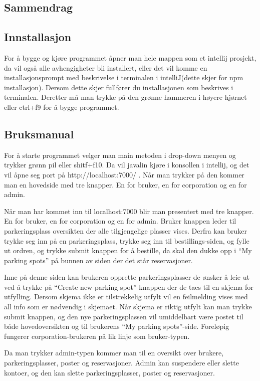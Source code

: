 \documentclass[12pt]{article}
\begin{document}
    \subsection{Sammendrag}

    \subsection{Innstallasjon}
    For å bygge og kjøre programmet åpner man hele mappen som et intellij prosjekt, da vil også alle avhengigheter bli installert, eller det vil komme en installasjonsprompt med beskrivelse i terminalen i  intelliJ(dette skjer for npm installasjon). Dersom dette skjer fullfører du installasjonen som beskrives i terminalen. Deretter må man trykke på den grønne hammeren i høyere hjørnet eller ctrl+f9 for å bygge programmet.

    \subsection{Bruksmanual}
    For å starte programmet velger man main metoden i drop-down menyen og trykker grønn pil eller shitf+f10. Da vil javalin kjøre i konsollen i intellij, og det vil åpne seg port på http://localhost:7000/ . Når man trykker på den kommer man en hovedside med tre knapper. En for bruker, en for corporation og en for admin.
    
    Når man har kommet inn til localhost:7000 blir man presentert med tre knapper. En for bruker, en for corporation og en for admin. Bruker knappen leder til parkeringsplass oversikten der alle tilgjengelige plasser vises. Derfra kan bruker trykke seg inn på en parkeringsplass, trykke seg inn til bestillings-siden, og fylle ut ordren, og trykke submit knappen for å bestille, da skal den dukke opp i “My parking spots” på bunnen av siden der det står reservasjoner.
    
    Inne på denne siden kan brukeren opprette parkeringsplasser de ønsker å leie ut ved å trykke på “Create new parking spot”-knappen der de taes til en skjema for utfylling. Dersom skjema ikke er tilstrekkelig utfylt vil en feilmelding vises med all info som er nødvendig i skjemaet. Når skjema er riktig utfylt kan man trykke submit knappen, og den nye parkeringsplassen vil umiddelbart være postet til både hovedoversikten og til brukerens “My parking spots”-side. Foreløpig fungerer corporation-brukeren på lik linje som bruker-typen.
    
    Da man trykker admin-typen kommer man til en oversikt over brukere, parkeringsplasser, poster og reservasjoner. Admin kan suspendere eller slette kontoer, og den kan slette parkeringsplasser, poster og reservasjoner.
\end{document}
